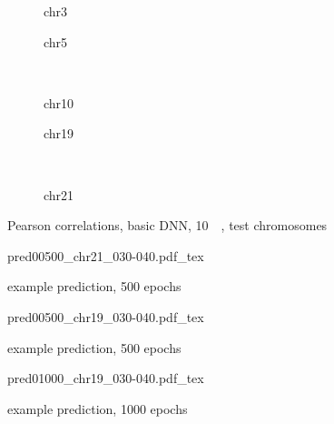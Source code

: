\begin{figure}[p]
    \begin{subfigure}{0.45\textwidth}
        \scriptsize
        \caption{chr3}
    \end{subfigure} \hfill
    \begin{subfigure}{0.45\textwidth}
        \scriptsize
        \caption{chr5}
    \end{subfigure}\\[5mm]
    \begin{subfigure}{0.45\textwidth}
        \scriptsize
        \caption{chr10}
    \end{subfigure}\hfill
    \begin{subfigure}{0.45\textwidth}
        \scriptsize
        \caption{chr19}
    \end{subfigure}\\[3mm]
    \centering
    \begin{subfigure}{0.45\textwidth}
        \scriptsize
        \caption{chr21}
    \end{subfigure}
    \caption{Pearson correlations, basic DNN, \SI{10}{\kilo\bp}, test chromosomes}
    \label{fig:results:basicDNN_10k_pearson}
\end{figure}

\begin{figure}[p]
    \scriptsize
    {pred00500_chr21_030-040.pdf_tex}
    \caption{example prediction, 500 epochs} \label{fig:results:00500_21_030-040}
\end{figure}
\begin{figure}[p]
    \scriptsize
    {pred00500_chr19_030-040.pdf_tex}
    \caption{example prediction, 500 epochs} \label{fig:results:00500_19_030-040}
\end{figure}
\begin{figure}[p]
    \scriptsize
    {pred01000_chr19_030-040.pdf_tex}
    \caption{example prediction, 1000 epochs} \label{fig:results:01000_19_030-040}
\end{figure}

